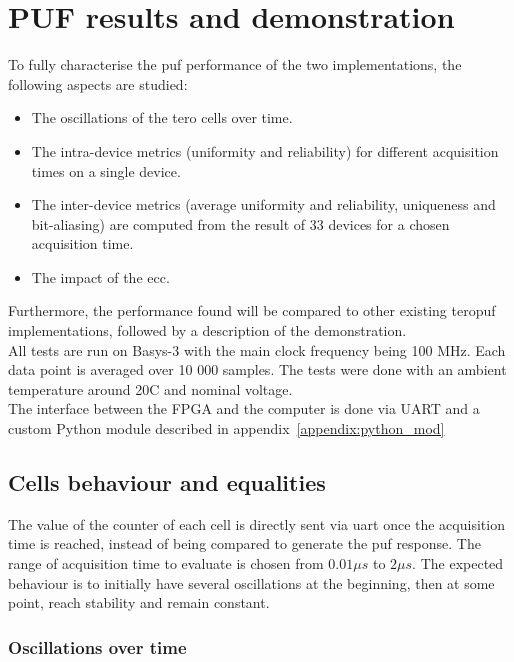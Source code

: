\chapter{PUF results and demonstration}
\label{ch:result}

To fully characterise the \acrshort{puf} performance of the two implementations, the following aspects are studied:

\begin{itemize}
    \item The oscillations of the \acrshort{tero} cells over time.
    \item The intra-device metrics (uniformity and reliability) for different acquisition times on a single device.
    \item The inter-device metrics (average uniformity and reliability, uniqueness and bit-aliasing) are computed from the result of 33 devices for a chosen acquisition time.
    \item The impact of the \acrfull{ecc}.
\end{itemize}

Furthermore, the performance found will be compared to other existing \acrshort{teropuf} implementations, followed by a description of the demonstration.\\

All tests are run on Basys-3 with the main clock frequency being 100 MHz. Each data point is averaged over 10 000 samples. The tests were done with an ambient temperature around 20\textdegree C and nominal voltage.\\

The interface between the FPGA and the computer is done via UART and a custom Python module described in appendix~\ref{appendix:python_mod}

\section{Cells behaviour and equalities}

The value of the counter of each cell is directly sent via \acrshort{uart} once the acquisition time is reached, instead of being compared to generate the \acrshort{puf} response. The range of acquisition time to evaluate is chosen from $0.01\mu s$ to $2\mu s$. The expected behaviour is to initially have several oscillations at the beginning, then at some point, reach stability and remain constant.

\subsection{Oscillations over time}
